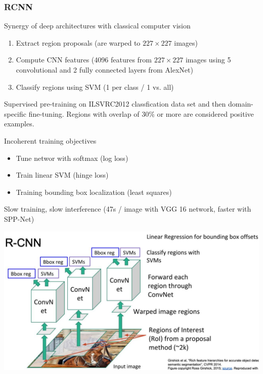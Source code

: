 \subsubsection{RCNN}
\begin{minipage}{0.5\textwidth}
    \glqq Synergy of deep architectures with classical computer vision\grqq
    \begin{enumerate}
        \item Extract region proposals (are warped to $227\times 227$ images)
        \item Compute CNN features (4096 features from $227\times 227$ images using 5 convolutional and 2 fully connected layers from AlexNet)
        \item Classify regions using SVM (1 per class / 1 vs. all)
    \end{enumerate}
    Supervised pre-training on ILSVRC2012 classfication data set and then domain-specific fine-tuning.
    Regions with overlap of 30\% or more are considered positive examples.

    Incoherent training objectives
    \begin{itemize}
        \item Tune networ with softmax (log loss)
        \item Train linear SVM (hinge loss)
        \item Training bounding box localization (least squares)
    \end{itemize}
    Slow training, slow interference (47s / image with VGG 16 network, faster with SPP-Net)
\end{minipage}
\begin{minipage}{0.5\textwidth}
    \includegraphics[width=1.0\textwidth]{sections/FindingMultipleObjects/img/rcnn.png}
\end{minipage}
